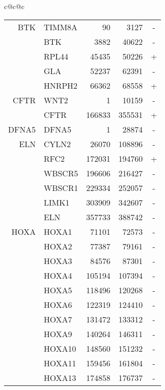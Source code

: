 \newcommand{\lb}[3]{\makebox[#1][#2]{#3}}

\begin{tabular}{c@{\quad}c@{\quad}c}
\begin{tabular}[t]{|r|lrrc|}
\hline
\lb{1cm}{r}{SEQ} & \lb{1.5cm}{l}{GENE} & \lb{1cm}{r}{START} & \lb{1cm}{r}{END} & \lb{0.5cm}{c}{STR} \\
\hline
     BTK & TIMM8A     &       90 &     3127 & - \\
         & BTK        &     3882 &    40622 & - \\
         & RPL44      &    45435 &    50226 & + \\
         & GLA        &    52237 &    62391 & - \\
         & HNRPH2     &    66362 &    68558 & + \\
\hline
    CFTR & WNT2       &        1 &    10159 & - \\
         & CFTR       &   166833 &   355531 & + \\
\hline
   DFNA5 & DFNA5      &        1 &    28874 & - \\
\hline
     ELN & CYLN2      &    26070 &   108896 & - \\
         & RFC2       &   172031 &   194760 & + \\
         & WBSCR5     &   196606 &   216427 & - \\
         & WBSCR1     &   229334 &   252057 & - \\
         & LIMK1      &   303909 &   342607 & - \\
         & ELN        &   357733 &   388742 & - \\
\hline
    HOXA & HOXA1      &    71101 &    72573 & - \\
         & HOXA2      &    77387 &    79161 & - \\
         & HOXA3      &    84576 &    87301 & - \\
         & HOXA4      &   105194 &   107394 & - \\
         & HOXA5      &   118496 &   120268 & - \\
         & HOXA6      &   122319 &   124410 & - \\
         & HOXA7      &   131472 &   133312 & - \\
         & HOXA9      &   140264 &   146311 & - \\
         & HOXA10     &   148560 &   151232 & - \\
         & HOXA11     &   159456 &   161804 & - \\
         & HOXA13     &   174858 &   176737 & - \\

\end{tabular}
\end{tabular}
